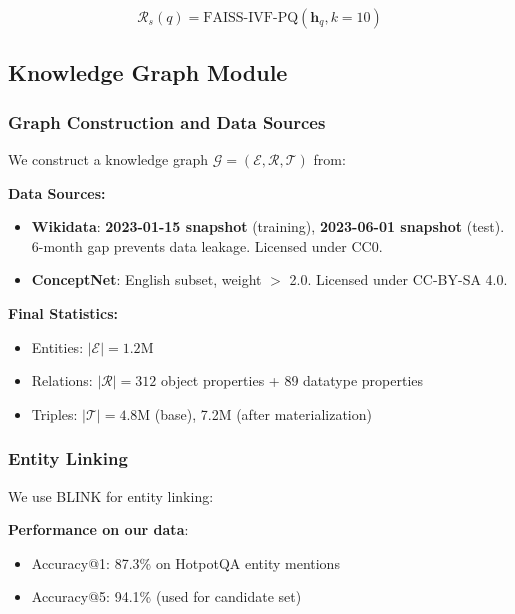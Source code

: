 \documentclass[10pt,twocolumn]{article}
\begin{document}
\begin{equation}
\mathcal{R}_s(q) = \text{FAISS-IVF-PQ}(\mathbf{h}_q, k=10)
\end{equation}


\subsection{Knowledge Graph Module}
\label{sec:ontology}

\subsubsection{Graph Construction and Data Sources}
\label{sec:kg_construction}

We construct a knowledge graph $\mathcal{G} = (\mathcal{E}, \mathcal{R}, \mathcal{T})$ from:

\textbf{Data Sources:}
\begin{itemize}
    \item \textbf{Wikidata}: \textbf{2023-01-15 snapshot} (training), \textbf{2023-06-01 snapshot} (test). 6-month gap prevents data leakage. Licensed under CC0.
    \item \textbf{ConceptNet}: English subset, weight $>$ 2.0. Licensed under CC-BY-SA 4.0.
\end{itemize}

\textbf{Final Statistics:}
\begin{itemize}
    \item Entities: $|\mathcal{E}| = 1.2$M
    \item Relations: $|\mathcal{R}| = 312$ object properties + 89 datatype properties
    \item Triples: $|\mathcal{T}| = 4.8$M (base), 7.2M (after materialization)
\end{itemize}

\subsubsection{Entity Linking}
\label{sec:entity_linking}

We use BLINK \cite{wu2020blink} for entity linking:

\textbf{Performance on our data}:
\begin{itemize}
    \item Accuracy@1: 87.3\% on HotpotQA entity mentions
    \item Accuracy@5: 94.1\% (used for candidate set)
\end{itemize}
\end{document}
